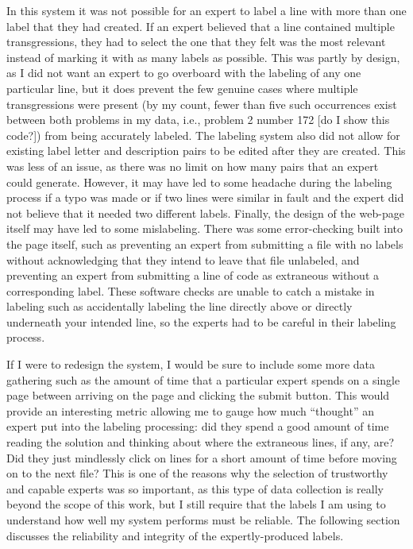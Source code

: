 \documentclass[draft]{article}
\begin{document}
In this system it was not possible for an expert to label a line with more than one label that they had created. If an expert believed that a line contained multiple transgressions, they had to select the one that they felt was the most relevant instead of marking it with as many labels as possible. This was partly by design, as I did not want an expert to go overboard with  the labeling of any one particular line, but it does prevent the few genuine cases where multiple transgressions were present (by my count, fewer than five such occurrences exist between both problems in my data, i.e., problem 2 number 172 [do I show this code?]) from being accurately labeled. The labeling system also did not allow for existing label letter and description pairs to be edited after they are created. This was less of an issue, as there was no limit on how many pairs that an expert could generate. However, it may have led to some headache during the labeling process if a typo was made or if two lines were similar in fault and the expert did not believe that it needed two different labels. Finally, the design of the web-page itself may have led to some mislabeling. There was some error-checking built into the page itself, such as preventing an expert from submitting a file with no labels without acknowledging that they intend to leave that file unlabeled, and preventing an expert from submitting a line of code as extraneous without a corresponding label. These software checks are unable to catch a mistake in labeling such as accidentally labeling the line directly above or directly underneath your intended line, so the experts had to be careful in their labeling process. 

If I were to redesign the system, I would be sure to include some more data gathering such as the amount of time that a particular expert spends on a single page between arriving on the page and clicking the submit button. This would provide an interesting metric allowing me to gauge how much ``thought'' an expert put into the labeling processing: did they spend a good amount of time reading the solution and thinking about where the extraneous lines, if any, are? Did they just mindlessly click on lines for a short amount of time before moving on to the next file? This is one of the reasons why the selection of trustworthy and capable experts was so important, as this type of data collection is really beyond the scope of this work, but I still require that the labels I am using to understand how well my system performs must be reliable. The following section discusses the reliability and integrity of the expertly-produced labels. 
\end{document}
